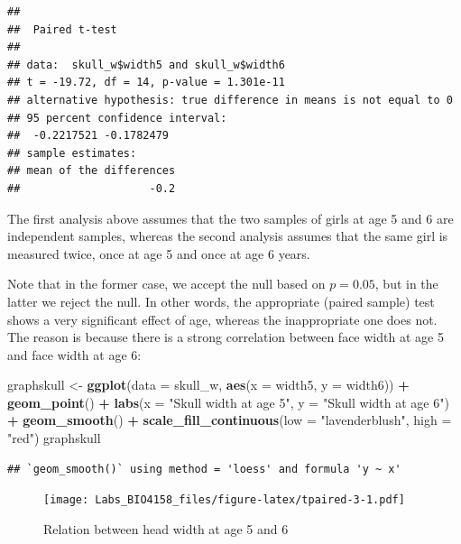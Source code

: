\documentclass[
  12pt,
]{book}
\newenvironment{Shaded}{\begin{snugshade}}{\end{snugshade}}
\newcommand{\DataTypeTok}[1]{\textcolor[rgb]{0.13,0.29,0.53}{#1}}
\newcommand{\KeywordTok}[1]{\textcolor[rgb]{0.13,0.29,0.53}{\textbf{#1}}}
\newcommand{\NormalTok}[1]{#1}
\newcommand{\OperatorTok}[1]{\textcolor[rgb]{0.81,0.36,0.00}{\textbf{#1}}}
\newcommand{\StringTok}[1]{\textcolor[rgb]{0.31,0.60,0.02}{#1}}
\begin{document}
\begin{verbatim}
## 
##  Paired t-test
## 
## data:  skull_w$width5 and skull_w$width6
## t = -19.72, df = 14, p-value = 1.301e-11
## alternative hypothesis: true difference in means is not equal to 0
## 95 percent confidence interval:
##  -0.2217521 -0.1782479
## sample estimates:
## mean of the differences 
##                    -0.2
\end{verbatim}

The first analysis above assumes that the two samples of girls at age 5 and 6 are independent samples, whereas the second analysis assumes that the same girl is measured twice, once at age 5 and once at age 6 years.

Note that in the former case, we accept the null based on \(p = 0.05\), but in the latter we reject the null. In other words, the appropriate (paired sample) test shows a very significant effect of age, whereas the inappropriate one does not. The reason is because there is a strong correlation between face width at age 5 and face width at age 6:

\begin{Shaded}
\begin{Highlighting}[]
\NormalTok{graphskull \textless{}{-}}\StringTok{ }\KeywordTok{ggplot}\NormalTok{(}\DataTypeTok{data =}\NormalTok{ skull\_w, }\KeywordTok{aes}\NormalTok{(}\DataTypeTok{x =}\NormalTok{ width5, }\DataTypeTok{y =}\NormalTok{ width6)) }\OperatorTok{+}
\StringTok{  }\KeywordTok{geom\_point}\NormalTok{() }\OperatorTok{+}
\StringTok{  }\KeywordTok{labs}\NormalTok{(}\DataTypeTok{x =} \StringTok{"Skull width at age 5"}\NormalTok{, }\DataTypeTok{y =} \StringTok{"Skull width at age 6"}\NormalTok{) }\OperatorTok{+}
\StringTok{  }\KeywordTok{geom\_smooth}\NormalTok{() }\OperatorTok{+}
\StringTok{  }\KeywordTok{scale\_fill\_continuous}\NormalTok{(}\DataTypeTok{low =} \StringTok{"lavenderblush"}\NormalTok{, }\DataTypeTok{high =} \StringTok{"red"}\NormalTok{)}
\NormalTok{graphskull}
\end{Highlighting}
\end{Shaded}

\begin{verbatim}
## `geom_smooth()` using method = 'loess' and formula 'y ~ x'
\end{verbatim}

\begin{figure}
\centering
\texttt{[image: Labs\_BIO4158\_files/figure-latex/tpaired-3-1.pdf]}
\caption{\label{fig:tpaired-3}Relation between head width at age 5 and 6}
\end{figure}
\end{document}
